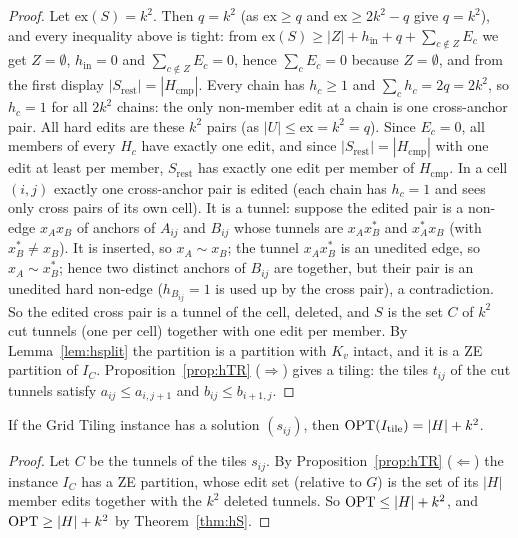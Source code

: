 \begin{proof}
Let $\mathrm{ex}(S)=k^2$. Then $q=k^2$ (as $\mathrm{ex}\ge q$ and $\mathrm{ex}\ge2k^2-q$ give $q=k^2$), and every inequality above is tight: from $\mathrm{ex}(S)\ge|Z|+h_{\mathrm{in}}+q+\sum_{c\notin Z}E_c$ we get $Z=\emptyset$, $h_{\mathrm{in}}=0$ and $\sum_{c\notin Z}E_c=0$, hence $\sum_cE_c=0$ because $Z=\emptyset$, and from the first display $|S_{\mathrm{rest}}|=|H_{\mathrm{cmp}}|$. Every chain has $h_c\ge1$ and $\sum_ch_c=2q=2k^2$, so $h_c=1$ for all $2k^2$ chains: the only non-member edit at a chain is one cross-anchor pair. All hard edits are these $k^2$ pairs (as $|U|\le\mathrm{ex}=k^2=q$). Since $E_c=0$, all members of every $H_c$ have exactly one edit, and since $|S_{\mathrm{rest}}|=|H_{\mathrm{cmp}}|$ with one edit at least per member, $S_{\mathrm{rest}}$ has exactly one edit per member of $H_{\mathrm{cmp}}$. In a cell $(i,j)$ exactly one cross-anchor pair is edited (each chain has $h_c=1$ and sees only cross pairs of its own cell). It is a tunnel: suppose the edited pair is a non-edge $x_Ax_B$ of anchors of $A_{ij}$ and $B_{ij}$ whose tunnels are $x_Ax_B^{*}$ and $x_A^{*}x_B$ (with $x_B^*\ne x_B$). It is inserted, so $x_A\sim x_B$; the tunnel $x_Ax_B^*$ is an unedited edge, so $x_A\sim x_B^*$; hence two distinct anchors of $B_{ij}$ are together, but their pair is an unedited hard non-edge ($h_{B_{ij}}=1$ is used up by the cross pair), a contradiction. So the edited cross pair is a tunnel of the cell, deleted, and $S$ is the set $C$ of $k^2$ cut tunnels (one per cell) together with one edit per member. By Lemma~\ref{lem:hsplit} the partition is a partition with $K_v$ intact, and it is a ZE partition of $I_C$. Proposition~\ref{prop:hTR} ($\Rightarrow$) gives a tiling: the tiles $t_{ij}$ of the cut tunnels satisfy $a_{ij}\le a_{i,j+1}$ and $b_{ij}\le b_{i+1,j}$.
\end{proof}

\begin{theorem}[Completeness]\label{thm:hC}
If the Grid Tiling instance has a solution $(s_{ij})$, then $\mathrm{OPT}(I_{\mathrm{tile}})=|H|+k^2$.
\end{theorem}
\begin{proof}
Let $C$ be the tunnels of the tiles $s_{ij}$. By Proposition~\ref{prop:hTR} ($\Leftarrow$) the instance $I_C$ has a ZE partition, whose edit set (relative to $G$) is the set of its $|H|$ member edits together with the $k^2$ deleted tunnels. So $\mathrm{OPT}\le|H|+k^2$, and $\mathrm{OPT}\ge|H|+k^2$ by Theorem~\ref{thm:hS}.
\end{proof}

